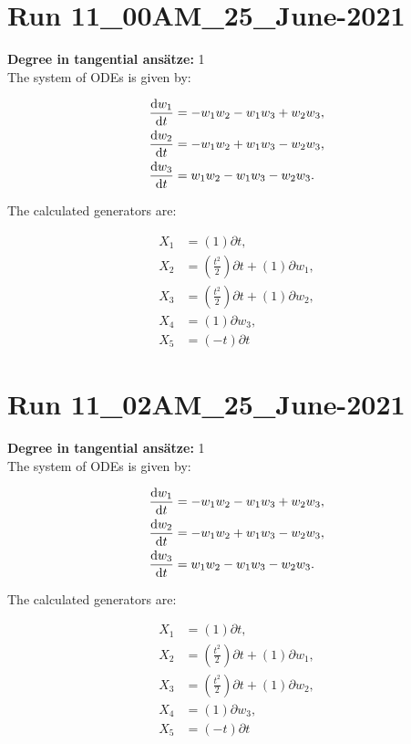 \section*{Run 11\_00AM\_25\_June-2021}
\textbf{Degree in tangential ansätze:}	1\\
The system of ODEs is given by:

\begin{align*}
\dv{w_{1}}{t}&=- w_{1} w_{2} - w_{1} w_{3} + w_{2} w_{3},\\
\dv{w_{2}}{t}&=- w_{1} w_{2} + w_{1} w_{3} - w_{2} w_{3},\\
\dv{w_{3}}{t}&=w_{1} w_{2} - w_{1} w_{3} - w_{2} w_{3}.\\
\end{align*}

\noindent The calculated generators are:

\begin{align*}
X_{1}&=\left( 1 \right)\partial t,\\
X_{2}&=\left( \frac{t^{2}}{2} \right)\partial t+\left( 1 \right)\partial w_{1},\\
X_{3}&=\left( \frac{t^{2}}{2} \right)\partial t+\left( 1 \right)\partial w_{2},\\
X_{4}&=\left( 1 \right)\partial w_{3},\\
X_{5}&=\left( - t \right)\partial t\end{align*}
\section*{Run 11\_02AM\_25\_June-2021}
\textbf{Degree in tangential ansätze:}	1\\
The system of ODEs is given by:

\begin{align*}
\dv{w_{1}}{t}&=- w_{1} w_{2} - w_{1} w_{3} + w_{2} w_{3},\\
\dv{w_{2}}{t}&=- w_{1} w_{2} + w_{1} w_{3} - w_{2} w_{3},\\
\dv{w_{3}}{t}&=w_{1} w_{2} - w_{1} w_{3} - w_{2} w_{3}.\\
\end{align*}

\noindent The calculated generators are:

\begin{align*}
X_{1}&=\left( 1 \right)\partial t,\\
X_{2}&=\left( \frac{t^{2}}{2} \right)\partial t+\left( 1 \right)\partial w_{1},\\
X_{3}&=\left( \frac{t^{2}}{2} \right)\partial t+\left( 1 \right)\partial w_{2},\\
X_{4}&=\left( 1 \right)\partial w_{3},\\
X_{5}&=\left( - t \right)\partial t\end{align*}
